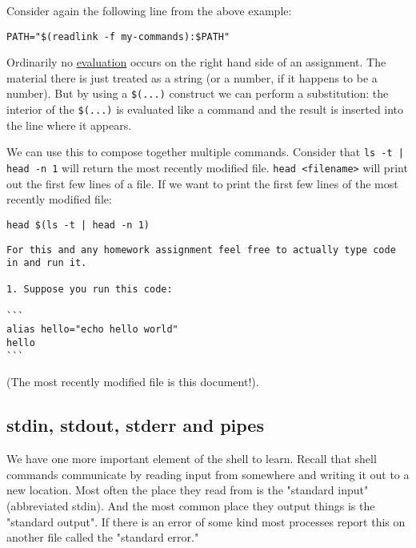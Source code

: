 \documentclass[11pt]{article}
\begin{document}
Consider again the following line from the above example:

\begin{verbatim}
PATH="$(readlink -f my-commands):$PATH"
\end{verbatim}

Ordinarily no \uline{evaluation} occurs on the right hand side of an
assignment. The material there is just treated as a string (or a
number, if it happens to be a number). But by using a \texttt{\$(...)}
construct we can perform a substitution: the interior of the \texttt{\$(...)}
is evaluated like a command and the result is inserted into the line
where it appears.

We can use this to compose together multiple commands. Consider that
\texttt{ls -t | head -n 1} will return the most recently modified file. \texttt{head
<filename>} will print out the first few lines of a file. If we want
to print the first few lines of the most recently modified file:

\begin{verbatim}
head $(ls -t | head -n 1)
\end{verbatim}

\begin{verbatim}
For this and any homework assignment feel free to actually type code
in and run it.

1. Suppose you run this code:

```
alias hello="echo hello world"
hello
```

\end{verbatim}

(The most recently modified file is this document!).

\subsection{stdin, stdout, stderr and pipes}
\label{sec:org7be4f7d}

We have one more important element of the shell to learn. Recall that
shell commands communicate by reading input from somewhere and writing
it out to a new location. Most often the place they read from is the
"standard input" (abbreviated stdin). And the most common place they
output things is the "standard output". If there is an error of some
kind most processes report this on another file called the "standard
error."
\end{document}

